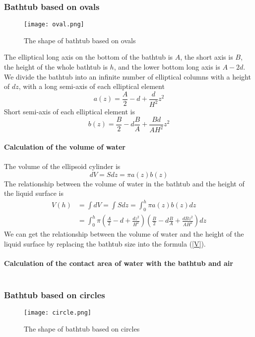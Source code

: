 \documentclass{mcmthesis}
\begin{document}
\subsubsection{Bathtub based on ovals}
\begin{figure}[H]
\centerline{\texttt{[image: oval.png]}}
\caption{The shape of bathtub based on ovals}
\label{oval}	
\end{figure}
The elliptical long axis on the bottom of the bathtub is $A$, the short axis is $B$, the height of the whole bathtub is $h$, and the lower bottom long axis is $A-2d$.\\
\indent We divide the bathtub into an infinite number of elliptical columns with a height of $dz$, with a long semi-axis of each elliptical element\\
\begin{equation}
a(z)=\frac{A}{2}-d+\frac{d}{{H}^{2}}{z}^{2}
\end{equation}
\indent Short semi-axis of each elliptical element is
\begin{equation}
b(z)=\frac{B}{2}-d\frac{B}{A}+\frac{Bd}{A{H}^{2}}{z}^{2}
\end{equation}\\
\textbf{Calculation of the volume of water} \\\\
\indent The volume of the ellipsoid cylinder is
\begin{equation}
dV=Sdz=\pi a(z)b(z)
\end{equation}
\indent The relationship between the volume of water in the bathtub and the height of the liquid surface is
\begin{equation}
\begin{split}
V(h)&=\int dV=\int Sdz=\int_{0}^{h}\pi a(z)b(z)dz \\
&=\int_{0}^{h}\pi(\frac{A}{2}-d+\frac{d{z}^{2}}{{H}^{2}})(\frac{B}{2}-d\frac{B}{A}+\frac{dB{z}^{2}}{A{H}^{2}})dz
\label{V}
\end{split}
\end{equation}
\indent We can get the relationship between the volume of water and the height of the liquid surface by replacing the bathtub size into the formula (\ref{V}).\\\\
\textbf{Calculation of the contact area of water with the bathtub and air} \\\\

\subsubsection{Bathtub based on circles}
\begin{figure}[H]
\centerline{\texttt{[image: circle.png]}}
\caption{The shape of bathtub based on circles}
\label{circle}	
\end{figure}
\end{document}
